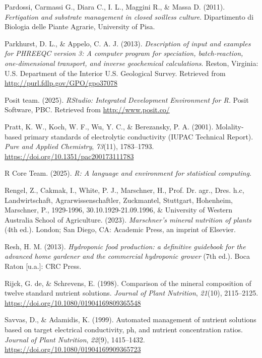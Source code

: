 \documentclass[
  letterpaper,
  DIV=11,
  numbers=noendperiod]{scrreprt}
\newlength{\cslhangindent}
\newenvironment{CSLReferences}[2] %
 {\begin{list}{}{%
  \setlength{\itemindent}{0pt}
  \setlength{\leftmargin}{0pt}
  \setlength{\parsep}{0pt}
  \ifodd #1
   \setlength{\leftmargin}{\cslhangindent}
   \setlength{\itemindent}{-1\cslhangindent}
  \fi
  \setlength{\itemsep}{#2\baselineskip}}}
 {\end{list}}
\begin{document}
\begin{CSLReferences}{1}{0}
Pardossi, Carmassi G., Diara C., I. L., Maggini R., \& Massa D. (2011).
\emph{{Fertigation and substrate management in closed soilless
culture}}. {Dipartimento di Biologia delle Piante Agrarie, University of
Pisa}.

Parkhurst, D. L., \& Appelo, C. A. J. (2013). \emph{{Description of
input and examples for PHREEQC version 3: A computer program for
speciation, batch-reaction, one-dimensional transport, and inverse
geochemical calculations}}. Reston, Virginia: {U.S. Department of the
Interior U.S. Geological Survey}. Retrieved from
\url{http://purl.fdlp.gov/GPO/gpo37078}

Posit team. (2025). \emph{{RStudio: Integrated Development Environment
for R.}} Posit Software, PBC. Retrieved from \url{http://www.posit.co/}

Pratt, K. W., Koch, W. F., Wu, Y. C., \& Berezansky, P. A. (2001).
{Molality-based primary standards of electrolytic conductivity (IUPAC
Technical Report)}. \emph{{Pure and Applied Chemistry}}, \emph{73}(11),
1783--1793. \url{https://doi.org/10.1351/pac200173111783}

R Core Team. (2025). \emph{{R: A language and environment for
statistical computing}}.

Rengel, Z., Cakmak, I., White, P. J., Marschner, H., Prof. Dr. agr.,
Dres. h.c, Landwirtschaft, Agrarwissenschaftler, Zuckmantel, Stuttgart,
Hohenheim, Marschner, P., 1929-1996, 30.10.1929-21.09.1996, \&
University of Western Australia School of Agriculture. (2023).
\emph{{Marschner's mineral nutrition of plants}} (4th ed.). London; San
Diego, CA: {Academic Press, an imprint of Elsevier}.

Resh, H. M. (2013). \emph{{Hydroponic food production: a definitive
guidebook for the advanced home gardener and the commercial hydroponic
grower}} (7th ed.). Boca Raton {[}u.a.{]}: {CRC Press}.

Rijck, G. de, \& Schrevens, E. (1998). {Comparison of the mineral
composition of twelve standard nutrient solutions}. \emph{{Journal of
Plant Nutrition}}, \emph{21}(10), 2115--2125.
\url{https://doi.org/10.1080/01904169809365548}

Savvas, D., \& Adamidis, K. (1999). {Automated management of nutrient
solutions based on target electrical conductivity, ph, and nutrient
concentration ratios}. \emph{{Journal of Plant Nutrition}},
\emph{22}(9), 1415--1432.
\url{https://doi.org/10.1080/01904169909365723}


\end{CSLReferences}
\end{document}
